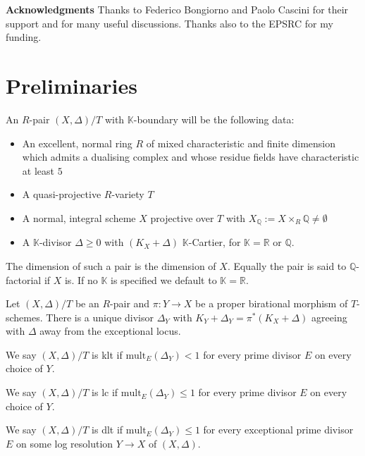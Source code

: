 \documentclass[a4paper,12pt]{amsart}
\begin{document}
	\textbf{Acknowledgments}
	Thanks to Federico Bongiorno and Paolo Cascini for their support and for many useful discussions. Thanks also to the EPSRC for my funding.	
	
	\section{Preliminaries}
	
	
	\begin{definition}\label{setup}
		An $R$-pair $(X,\Delta)/ T$ with $\mathbb{K}$-boundary will be the following data:
		\begin{itemize}
			\item An excellent, normal ring $R$ of mixed characteristic and finite dimension which admits a dualising complex and whose residue fields have characteristic at least $5$
			\item A quasi-projective $R$-variety $T$
			\item A normal, integral scheme $X$ projective over $T$ with $X_{\mathbb{Q}}:=X \times_{R} \mathbb{Q} \neq \emptyset$ 
			\item A $\mathbb{K}$-divisor $\Delta \geq 0$ with $(K_{X}+\Delta)$ $\mathbb{K}$-Cartier, for $\mathbb{K}=\mathbb{R}$ or $\mathbb{Q}$.
		\end{itemize}
		
		The dimension of such a pair is the dimension of $X$. Equally the pair is said to $\mathbb{Q}$-factorial if $X$ is. If no $\mathbb{K}$ is specified we default to $\mathbb{K}=\mathbb{R}$.
	\end{definition}

	
	\begin{definition}
		Let $(X,\Delta)/T$ be an $R$-pair and $\pi:Y \to X$ be a proper birational morphism of $T$-schemes. There is a unique divisor $\Delta_{Y}$ with $K_{Y}+\Delta_{Y}=\pi^{*}(K_{X}+\Delta)$ agreeing with $\Delta$ away from the exceptional locus. 
		
		We say $(X,\Delta)/T$ is klt if $\text{mult}_{E}(\Delta_{Y}) <1$ for every prime divisor $E$ on every choice of $Y$.
		
		We say $(X,\Delta)/T$ is lc if $\text{mult}_{E}(\Delta_{Y}) \leq 1$ for every prime divisor $E$ on every choice of $Y$.
		
		We say $(X,\Delta)/T$ is dlt if $\text{mult}_{E}(\Delta_{Y}) \leq 1$ for every exceptional prime divisor $E$ on some log resolution $Y\to X$ of $(X,\Delta)$.
	\end{definition}
	
\end{document}
